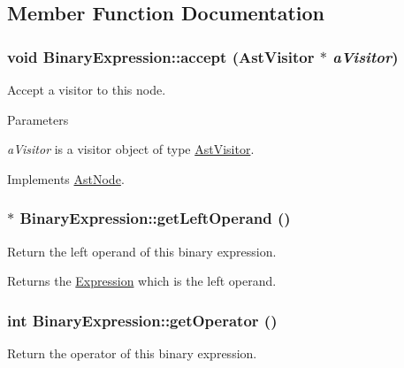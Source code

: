 \subsection{Member Function Documentation}
\hypertarget{classBinaryExpression_a2af7e73b6a90c216ef00b6297ce83da5}{
\subsubsection[{accept}]{\setlength{\rightskip}{0pt plus 5cm}void BinaryExpression::accept ({\bf AstVisitor} $\ast$ {\em aVisitor})}}
\label{classBinaryExpression_a2af7e73b6a90c216ef00b6297ce83da5}
Accept a visitor to this node. 
\begin{DoxyParams}{Parameters}
\item[{\em aVisitor}]is a visitor object of type \hyperlink{classAstVisitor}{AstVisitor}. \end{DoxyParams}


Implements \hyperlink{classAstNode_a67b2d6ce1262da2954fb4db255759fb3}{AstNode}.\hypertarget{classBinaryExpression_a0b8e6e09079d13b029c1fae785e0be01}{
\subsubsection[{getLeftOperand}]{$\ast$ BinaryExpression::getLeftOperand ()}}
\label{classBinaryExpression_a0b8e6e09079d13b029c1fae785e0be01}
Return the left operand of this binary expression.

\begin{DoxyReturn}{Returns}
the \hyperlink{classExpression}{Expression} which is the left operand. 
\end{DoxyReturn}
\hypertarget{classBinaryExpression_af2d7644a8e57083fe9c550cf02900068}{
\subsubsection[{getOperator}]{\setlength{\rightskip}{0pt plus 5cm}int BinaryExpression::getOperator ()}}
\label{classBinaryExpression_af2d7644a8e57083fe9c550cf02900068}
Return the operator of this binary expression.

